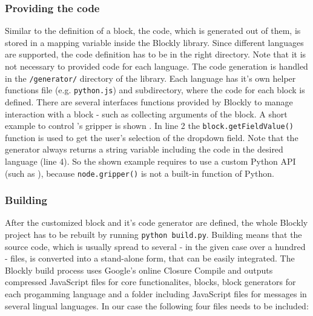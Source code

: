 \subsubsection{Providing the code}
Similar to the definition of a block, the code, which is generated out of them, is stored in a mapping variable inside the Blockly library. Since different languages are supported, the code definition has to be in the right directory. Note that it is not necessary to provided code for each language. The code generation is handled in the \lstinline!/generator/! directory of the library. Each language has it's own helper functions file (e.g. \lstinline!python.js!) and subdirectory, where the code for each block is defined. There are several interfaces functions provided by Blockly to manage interaction with a block - such as collecting arguments of the block. A short example to control \hobbit{}'s gripper is shown . In line 2 the \lstinline!block.getFieldValue()! function is used to get the user's selection of the dropdown field. Note that the generator always returns a string variable including the code in the desired language (line 4). So the shown example requires to use a custom Python API (such as ), because \lstinline!node.gripper()! is not a built-in function of Python. \\

\begin{figure}[htbp]
	
\end{figure}

\subsubsection{Building}
After the customized block and it's code generator are defined, the whole Blockly project has to be rebuilt by running \lstinline!python build.py!. Building means that the source code, which is usually spread to several - in the given case over a hundred - files, is converted into a stand-alone form, that can be easily integrated. The Blockly build process uses Google's online Closure Compile and outputs compressed JavaScript files for core functionalites, blocks, block generators for each progamming language and a folder including JavaScript files for messages in several lingual languages. In our case the following four files needs to be included:

